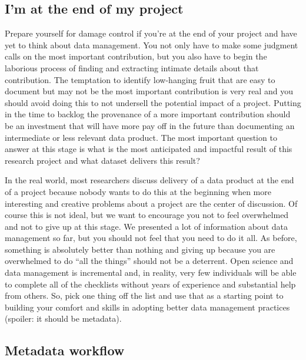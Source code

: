 \documentclass[
]{book}
\begin{document}
\hypertarget{endproject}{%
\subsection{I'm at the end of my project}\label{endproject}}

Prepare yourself for damage control if you're at the end of your project and have yet to think about data management. You not only have to make some judgment calls on the most important contribution, but you also have to begin the laborious process of finding and extracting intimate details about that contribution. The temptation to identify low-hanging fruit that are easy to document but may not be the most important contribution is very real and you should avoid doing this to not undersell the potential impact of a project. Putting in the time to backlog the provenance of a more important contribution should be an investment that will have more pay off in the future than documenting an intermediate or less relevant data product. The most important question to answer at this stage is what is the most anticipated and impactful result of this research project and what dataset delivers this result?

In the real world, most researchers discuss delivery of a data product at the end of a project because nobody wants to do this at the beginning when more interesting and creative problems about a project are the center of discussion. Of course this is not ideal, but we want to encourage you not to feel overwhelmed and not to give up at this stage. We presented a lot of information about data management so far, but you should not feel that you need to do it all. As before, something is absolutely better than nothing and giving up because you are overwhelmed to do ``all the things'' should not be a deterrent. Open science and data management is incremental and, in reality, very few individuals will be able to complete all of the checklists without years of experience and substantial help from others. So, pick one thing off the list and use that as a starting point to building your comfort and skills in adopting better data management practices (spoiler: it should be metadata).

\hypertarget{metadata-workflow}{%
\subsection{Metadata workflow}\label{metadata-workflow}}
\end{document}
